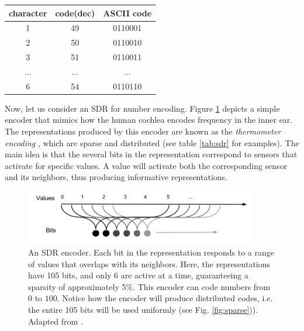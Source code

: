 \documentclass[runningheads]{llncs}
\begin{document}
\begin{center}
 \label{tab:ascci}
 \begin{tabular}{||c c c ||} 
 \hline
 character & code(dec) & ASCII code \\ [0.5ex] 
 \hline\hline
 1 & 49 & 0110001 \\
 \hline
 2 & 50 & 0110010 \\
 \hline
 3 & 51 & 0110011 \\
 \hline
 $\dots$ &  $\dots$ &  $\dots$\\ 
 \hline
 6 & 54 & 0110110 \\ [1ex]
 \hline
\end{tabular}
\end{center}

Now, let us consider an SDR for number encoding. Figure \ref{fig:SDR_number_encoder} depicts a simple encoder that mimics how the human cochlea encodes frequency in the inner ear. The representations produced by this encoder are known as the \textit{thermometer encoding} \cite{buckman2018thermometer},  which are sparse and distributed (see table \ref{tab:sdr} for examples). The main idea is that the several bits in the representation correspond to sensors that activate for specific values. A value will activate both the corresponding sensor and its neighbors, thus producing informative representations. 

\begin{figure}[h]
    \centering
    \includegraphics[width=0.9\textwidth]{img/SDR_number_encoder.PNG}
    \caption{An SDR encoder. Each bit in the representation responds to a range of values that overlaps with its neighbors. Here, the representations have 105 bits, and only 6 are active at a time, guaranteeing a sparsity of approximately 5\%. This encoder can code numbers from $0$ to $100$. Notice how the encoder will produce distributed codes, i.e. the entire 105 bits will be used uniformly (see Fig. \ref{fig:sparse})). Adapted from \cite{Hawkins-et-al-2016-Book}.}
\label{fig:SDR_number_encoder}
\end{figure}

\newpage
\end{document}
